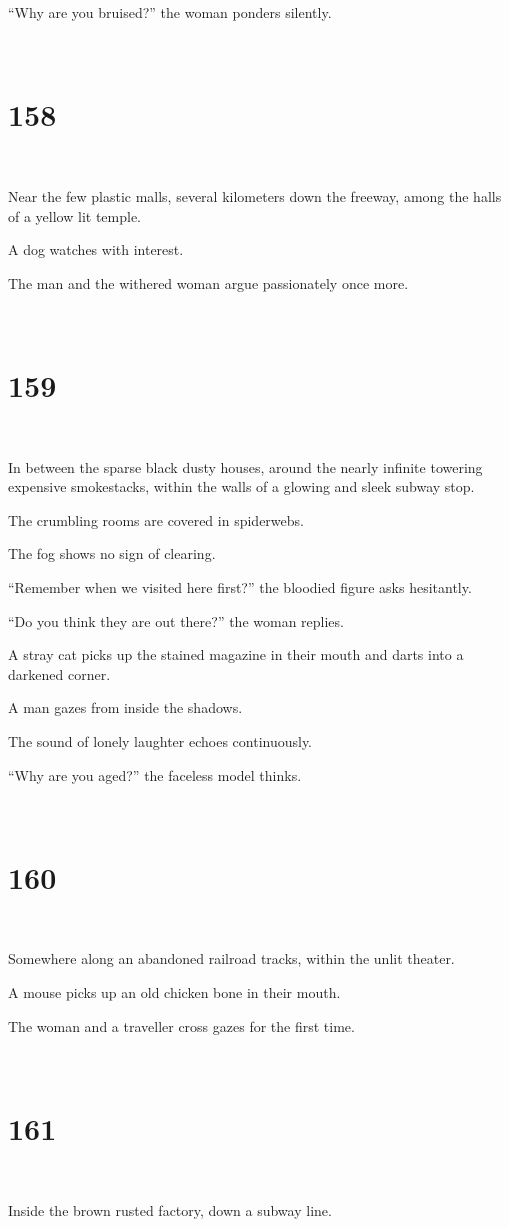 \documentclass{report}
\begin{document}
``Why are you bruised?'' the woman ponders silently.

~
\chapter*{158}
~

Near the few plastic malls, several kilometers down the freeway, among the halls of a yellow lit temple.

A dog watches with interest.

The man and the withered woman argue passionately once more.

~
\chapter*{159}
~

In between the sparse black dusty houses, around the nearly infinite towering expensive smokestacks, within the walls of a glowing and sleek subway stop.

The crumbling rooms are covered in spiderwebs.

The fog shows no sign of clearing.

``Remember when we visited here first?'' the bloodied figure asks hesitantly.

``Do you think they are out there?'' the woman replies.

A stray cat picks up the stained magazine in their mouth and darts into a darkened corner.

A man gazes from inside the shadows.

The sound of lonely laughter echoes continuously.

``Why are you aged?'' the faceless model thinks.

~
\chapter*{160}
~

Somewhere along an abandoned railroad tracks, within the unlit theater.

A mouse picks up an old chicken bone in their mouth.

The woman and a traveller cross gazes for the first time.

~
\chapter*{161}
~

Inside the brown rusted factory, down a subway line.
\end{document}
